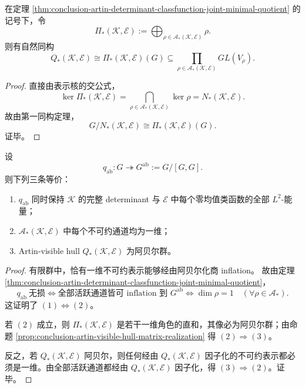 \begin{proposition}\label{prop:conclusion-artin-visible-hull-matrix-realization}
在定理 \ref{thm:conclusion-artin-determinant-classfunction-joint-minimal-quotient} 的记号下，令
\[
\Pi_\ast(\mathcal K,\mathcal E)
:=
\bigoplus_{\rho\in\mathcal A_\ast(\mathcal K,\mathcal E)}\rho.
\]
则有自然同构
\[
Q_\ast(\mathcal K,\mathcal E)
\cong
\Pi_\ast(\mathcal K,\mathcal E)(G)
\subseteq
\prod_{\rho\in\mathcal A_\ast(\mathcal K,\mathcal E)}GL(V_\rho).
\]
\end{proposition}

\begin{proof}
直接由表示核的交公式，
\[
\ker \Pi_\ast(\mathcal K,\mathcal E)
=
\bigcap_{\rho\in\mathcal A_\ast(\mathcal K,\mathcal E)}\ker\rho
=
N_\ast(\mathcal K,\mathcal E).
\]
故由第一同构定理，
\[
G/N_\ast(\mathcal K,\mathcal E)\cong \Pi_\ast(\mathcal K,\mathcal E)(G).
\]
证毕。
\end{proof}

\begin{corollary}[阿贝尔化无损的充要条件]\label{cor:conclusion-artin-visible-hull-abelianization-criterion}
设
\[
q_{\mathrm{ab}}:G\twoheadrightarrow G^{\mathrm{ab}}:=G/[G,G].
\]
则下列三条等价：
\begin{enumerate}
  \item \(q_{\mathrm{ab}}\) 同时保持 \(\mathcal K\) 的完整 determinant 与 \(\mathcal E\) 中每个零均值类函数的全部 \(L^2\)-能量；
  \item \(\mathcal A_\ast(\mathcal K,\mathcal E)\) 中每个不可约通道均为一维；
  \item Artin-visible hull \(Q_\ast(\mathcal K,\mathcal E)\) 为阿贝尔群。
\end{enumerate}
\end{corollary}

\begin{proof}
有限群中，恰有一维不可约表示能够经由阿贝尔化商 inflation。
故由定理 \ref{thm:conclusion-artin-determinant-classfunction-joint-minimal-quotient}，
\[
q_{\mathrm{ab}}\ \text{无损}
\iff
\text{全部活跃通道皆可 inflation 到 } G^{\mathrm{ab}}
\iff
\dim\rho=1\quad(\forall \rho\in\mathcal A_\ast).
\]
这证明了 \((1)\Leftrightarrow(2)\)。

若 \((2)\) 成立，则 \(\Pi_\ast(\mathcal K,\mathcal E)\) 是若干一维角色的直和，其像必为阿贝尔群；由命题 \ref{prop:conclusion-artin-visible-hull-matrix-realization} 得 \((2)\Rightarrow(3)\)。

反之，若 \(Q_\ast(\mathcal K,\mathcal E)\) 阿贝尔，则任何经由 \(Q_\ast(\mathcal K,\mathcal E)\) 因子化的不可约表示都必须是一维。由全部活跃通道都经由 \(Q_\ast(\mathcal K,\mathcal E)\) 因子化，得 \((3)\Rightarrow(2)\)。证毕。
\end{proof}

